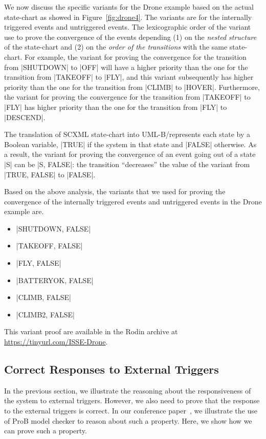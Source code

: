 We now discuss the specific variants for the Drone example based on
the actual state-chart as showed in Figure~\ref{fig:drone4}.  The
variants are for the internally triggered events and untriggered
events. The lexicographic order of the variant use to prove the
convergence of the events depending (1) on the \emph{nested structure}
of the state-chart and (2) on the \emph{order of the transitions} with
the same state-chart.  For example, the variant for proving the
convergence for the transition from |SHUTDOWN| to |OFF| will have a
higher priority than the one for the transition from |TAKEOFF| to
|FLY|, and this variant subsequently has higher priority than the one
for the transition from |CLIMB| to |HOVER|.  Furthermore, the variant
for proving the convergence for the transition from |TAKEOFF| to |FLY|
has higher priority than the one for the transition from |FLY| to
|DESCEND|.

The translation of SCXML state-chart into UML-B/\EventB represents each
state by a Boolean variable, |TRUE| if the system in that state and
|FALSE| otherwise. As a result, the variant for proving the convergence
of an event going out of a state |S| can be |{S, FALSE}|: the
transition ``decreases'' the value of the variant from |{TRUE, FALSE}|
to |FALSE|.

Based on the above analysis, the variants that we used for proving the
convergence of the internally triggered events and untriggered events
in the Drone example are.
\begin{itemize}
\item |{SHUTDOWN, FALSE}|

\item |{TAKEOFF, FALSE}|

\item |{FLY, FALSE}|

\item |{BATTERYOK, FALSE}|

\item |{CLIMB, FALSE}|

\item |{CLIMB2, FALSE}|
\end{itemize}

This variant proof are available in the Rodin archive at
\url{https://tinyurl.com/ISSE-Drone}.


\subsection{Correct Responses to External Triggers}
\label{sec:corr-resp-extern}
In the previous section, we illustrate the reasoning about the
responsiveness of the system to external triggers.  However, we also
need to prove that the response to the external triggers is correct.
In our conference paper~\cite{detect2020}, we illustrate the use of
ProB model checker to reason about such a property.  Here, we show how
we can prove such a property.

